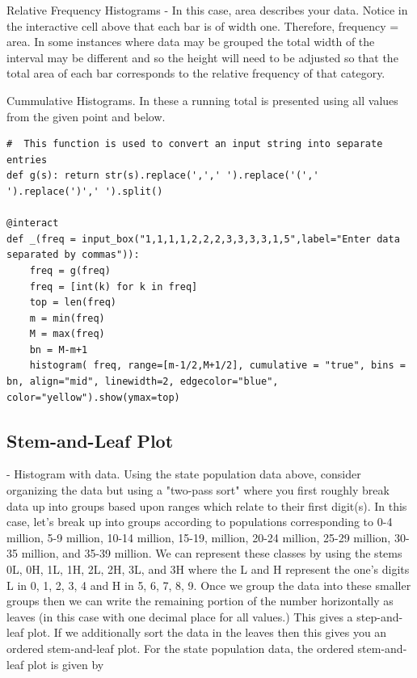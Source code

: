 \documentclass[10pt,]{book}
\theoremstyle{plain}
\theoremstyle{definition}
\theoremstyle{definition}
\theoremstyle{definition}
\numberwithin{equation}{section}
\begin{document}
\par
Relative Frequency Histograms - In this case, area describes your data.  Notice in the interactive cell above that each bar is of width one. Therefore, frequency = area. In some instances where data may be grouped the total width of the interval may be different and so the height will need to be adjusted so that the total area of each bar corresponds to the relative frequency of that category.%
\par
Cummulative Histograms.  In these a running total is presented using all values from the given point and below.
\begin{lstlisting}[style=sageinput]
#  This function is used to convert an input string into separate entries
def g(s): return str(s).replace(',',' ').replace('(',' ').replace(')',' ').split()

@interact
def _(freq = input_box("1,1,1,1,2,2,2,3,3,3,3,1,5",label="Enter data separated by commas")):
    freq = g(freq)
    freq = [int(k) for k in freq]
    top = len(freq)
    m = min(freq)
    M = max(freq)
    bn = M-m+1
    histogram( freq, range=[m-1/2,M+1/2], cumulative = "true", bins = bn, align="mid", linewidth=2, edgecolor="blue", color="yellow").show(ymax=top)
\end{lstlisting}
		
%
\typeout{************************************************}
\typeout{************************************************}
\subsection[{Stem-and-Leaf Plot}]{Stem-and-Leaf Plot}\label{subsection-4}
 - Histogram with data. Using the state population data above, consider organizing the data but using a "two-pass sort" where you first roughly break data up into groups based upon ranges which relate to their first digit(s). In this case, let's break up into groups according to populations corresponding to 0-4 million, 5-9 million, 10-14 million, 15-19, million, 20-24 million, 25-29 million, 30-35 million, and 35-39 million. We can represent these classes by using the stems 0L, 0H, 1L, 1H, 2L, 2H, 3L, and 3H where the L and H represent the one's digits L in {0, 1, 2, 3, 4} and H in {5, 6, 7, 8, 9}.  Once we group the data into these smaller groups then we can write the remaining portion of the number horizontally as leaves (in this case with one decimal place for all values.) This gives a step-and-leaf plot. If we additionally sort the data in the leaves then this gives you an ordered stem-and-leaf plot. For the state population data, the ordered stem-and-leaf plot is given by
		
\end{document}
